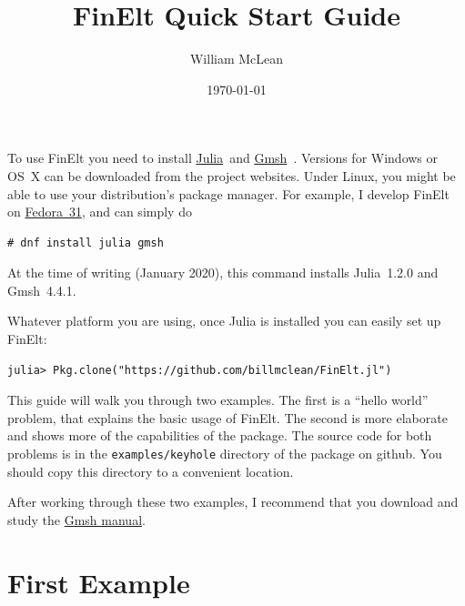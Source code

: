 \documentclass[a4paper,12pt]{article}
\title{FinElt Quick Start Guide}
\author{William McLean}
\date{\today}
\begin{document}
\maketitle
To use FinElt you need to install \href{www.julialan.org}{Julia}~and 
\href{www.geuz.org/gmsh/}{Gmsh}~\cite{Gmsh}.  Versions for Windows or 
OS~X can be downloaded from the project websites.  Under Linux, you
might be able to use your distribution's package manager.  For 
example, I develop FinElt on \href{www.fedoraproject.org}{Fedora~31}, 
and can simply do
\begin{verbatim}
# dnf install julia gmsh 
\end{verbatim}
At the time of writing (January 2020), this command installs Julia~1.2.0 and
Gmsh~4.4.1.

Whatever platform you are using, once Julia is installed you can 
easily set up FinElt:
\begin{verbatim}
julia> Pkg.clone("https://github.com/billmclean/FinElt.jl")
\end{verbatim}
This guide will walk you through two examples.  The first is a 
``hello world'' problem, that explains the basic usage of FinElt.
The second is more elaborate and shows more of the capabilities of 
the package.  The source code for both problems is in the 
\texttt{examples/keyhole} directory of the package on github.
You should copy this directory to a convenient location.

After working through these two examples, I recommend that you 
download and study the 
\href{http://www.geuz.org/gmsh/doc/texinfo/gmsh.pdf}{Gmsh manual}.
\section*{First Example}
\end{document}

